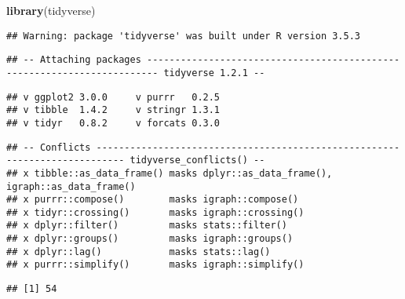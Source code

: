\documentclass[]{article}
\newenvironment{Shaded}{\begin{snugshade}}{\end{snugshade}}
\newcommand{\KeywordTok}[1]{\textcolor[rgb]{0.13,0.29,0.53}{\textbf{#1}}}
\newcommand{\StringTok}[1]{\textcolor[rgb]{0.31,0.60,0.02}{#1}}
\newcommand{\OperatorTok}[1]{\textcolor[rgb]{0.81,0.36,0.00}{\textbf{#1}}}
\newcommand{\NormalTok}[1]{#1}
\begin{document}
\begin{Shaded}
\begin{Highlighting}[]
\KeywordTok{library}\NormalTok{(tidyverse)}
\end{Highlighting}
\end{Shaded}

\begin{verbatim}
## Warning: package 'tidyverse' was built under R version 3.5.3
\end{verbatim}

\begin{verbatim}
## -- Attaching packages ------------------------------------------------------------------------ tidyverse 1.2.1 --
\end{verbatim}

\begin{verbatim}
## v ggplot2 3.0.0     v purrr   0.2.5
## v tibble  1.4.2     v stringr 1.3.1
## v tidyr   0.8.2     v forcats 0.3.0
\end{verbatim}

\begin{verbatim}
## -- Conflicts --------------------------------------------------------------------------- tidyverse_conflicts() --
## x tibble::as_data_frame() masks dplyr::as_data_frame(), igraph::as_data_frame()
## x purrr::compose()        masks igraph::compose()
## x tidyr::crossing()       masks igraph::crossing()
## x dplyr::filter()         masks stats::filter()
## x dplyr::groups()         masks igraph::groups()
## x dplyr::lag()            masks stats::lag()
## x purrr::simplify()       masks igraph::simplify()
\end{verbatim}

\begin{Shaded}
\end{Shaded}

\begin{verbatim}
## [1] 54
\end{verbatim}

\begin{Shaded}
\end{Shaded}
\end{document}
